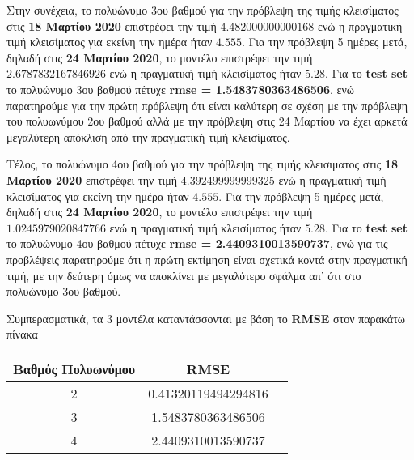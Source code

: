 \documentclass[Second Project.tex]{subfiles}
\begin{document}
Στην συνέχεια, το πολυώνυμο 3ου βαθμού για την πρόβλεψη της τιμής κλεισίματος στις \textbf{18 Μαρτίου 2020} 
επιστρέφει την τιμή $4.482000000000168$ ενώ η πραγματική τιμή κλεισίματος για εκείνη την ημέρα ήταν
$4.555$. Για την πρόβλεψη 5 ημέρες μετά, δηλαδή στις \textbf{24 Μαρτίου 2020}, το μοντέλο επιστρέφει την τιμή 
$2.6787832167846926$ ενώ η πραγματική τιμή κλεισίματος ήταν $5.28$. Για το \textlatin{\textbf{test set}} το
πολυώνυμο 3ου βαθμού πέτυχε \textbf{\textlatin{rmse} = 1.5483780363486506}, ενώ παρατηρούμε για την πρώτη 
πρόβλεψη ότι είναι καλύτερη σε σχέση με την πρόβλεψη του πολυωνύμου 2ου βαθμού αλλά με την πρόβλεψη στις 24
Μαρτίου να έχει αρκετά μεγαλύτερη απόκλιση από την πραγματική τιμή κλεισίματος. 

Τέλος, το πολυώνυμο 4ου βαθμού για την πρόβλεψη της τιμής κλεισιματος στις \textbf{18 Μαρτίου 2020} 
επιστρέφει την τιμή $4.392499999999325$ ενώ η πραγματική τιμή κλεισίματος για εκείνη την ημέρα ήταν
$4.555$. Για την πρόβλεψη 5 ημέρες μετά, δηλαδή στις \textbf{24 Μαρτίου 2020}, το μοντέλο επιστρέφει την τιμή 
$1.0245979020847766$ ενώ η πραγματική τιμή κλεισίματος ήταν $5.28$. Για το \textlatin{\textbf{test set}} το
πολυώνυμο 4ου βαθμού πέτυχε \textbf{\textlatin{rmse} = 2.4409310013590737}, ενώ για τις προβλέψεις παρατηρούμε 
ότι η πρώτη εκτίμηση είναι σχετικά κοντά στην πραγματική τιμή, με την δεύτερη όμως να αποκλίνει με μεγαλύτερο 
σφάλμα απ' ότι στο πολυώνυμο 3ου βαθμού.

Συμπερασματικά, τα 3 μοντέλα καταντάσσονται με βάση το \textlatin{\textbf{RMSE}} στον παρακάτω πίνακα
\begin{center}
    \begin{tabular}{ |c|c|c| } 
     \hline
     Βαθμός Πολυωνύμου & \textlatin{RMSE} \\
     \hline
     2 & 0.41320119494294816 \\
     \hline
     3 & 1.5483780363486506 \\ 
     \hline
     4 & 2.4409310013590737 \\
     \hline
    \end{tabular}
\end{center}
\end{document}
